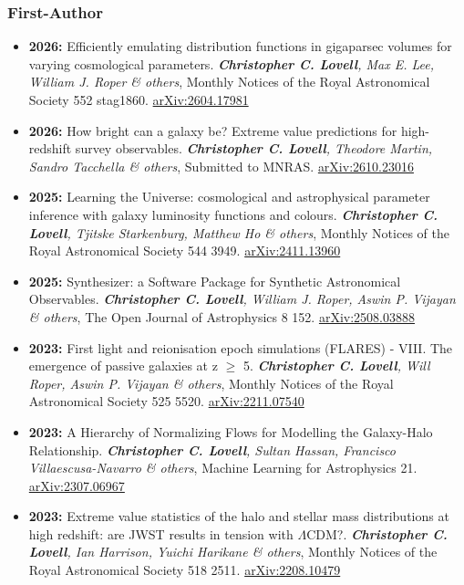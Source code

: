\subsubsection*{First-Author}
\begin{itemize}
\item \textbf{2026:} Efficiently emulating distribution functions in gigaparsec volumes for varying cosmological parameters. \textit{\textbf{Christopher C. Lovell}, Max E. Lee, William J. Roper \& others}, Monthly Notices of the Royal Astronomical Society 552 stag1860. \href{https://arxiv.org/abs/2604.17981}{arXiv:2604.17981}
\item \textbf{2026:} How bright can a galaxy be? Extreme value predictions for high-redshift survey observables. \textit{\textbf{Christopher C. Lovell}, Theodore Martin, Sandro Tacchella \& others}, Submitted to MNRAS. \href{https://arxiv.org/abs/2610.23016}{arXiv:2610.23016}
\item \textbf{2025:} Learning the Universe: cosmological and astrophysical parameter inference with galaxy luminosity functions and colours. \textit{\textbf{Christopher C. Lovell}, Tjitske Starkenburg, Matthew Ho \& others}, Monthly Notices of the Royal Astronomical Society 544 3949. \href{https://arxiv.org/abs/2411.13960}{arXiv:2411.13960}
\item \textbf{2025:} Synthesizer: a Software Package for Synthetic Astronomical Observables. \textit{\textbf{Christopher C. Lovell}, William J. Roper, Aswin P. Vijayan \& others}, The Open Journal of Astrophysics 8 152. \href{https://arxiv.org/abs/2508.03888}{arXiv:2508.03888}
\item \textbf{2023:} First light and reionisation epoch simulations (FLARES) - VIII. The emergence of passive galaxies at z $\geq$ 5. \textit{\textbf{Christopher C. Lovell}, Will Roper, Aswin P. Vijayan \& others}, Monthly Notices of the Royal Astronomical Society 525 5520. \href{https://arxiv.org/abs/2211.07540}{arXiv:2211.07540}
\item \textbf{2023:} A Hierarchy of Normalizing Flows for Modelling the Galaxy-Halo Relationship. \textit{\textbf{Christopher C. Lovell}, Sultan Hassan, Francisco Villaescusa-Navarro \& others}, Machine Learning for Astrophysics 21. \href{https://arxiv.org/abs/2307.06967}{arXiv:2307.06967}
\item \textbf{2023:} Extreme value statistics of the halo and stellar mass distributions at high redshift: are JWST results in tension with $\Lambda$CDM?. \textit{\textbf{Christopher C. Lovell}, Ian Harrison, Yuichi Harikane \& others}, Monthly Notices of the Royal Astronomical Society 518 2511. \href{https://arxiv.org/abs/2208.10479}{arXiv:2208.10479}

\end{itemize}

